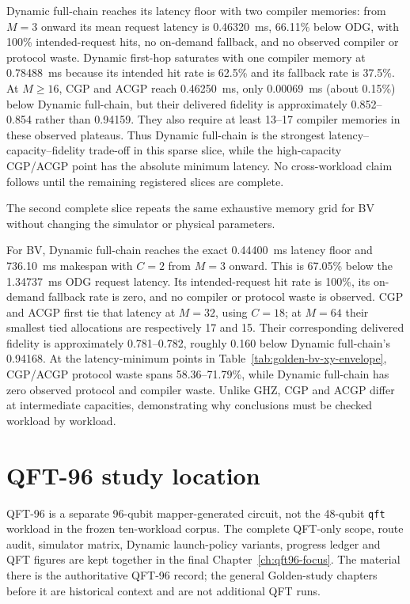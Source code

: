 

Dynamic full-chain reaches its latency floor with two compiler memories: from
$M=3$ onward its mean request latency is 0.46320~ms, 66.11\% below ODG, with
100\% intended-request hits, no on-demand fallback, and no observed compiler or
protocol waste. Dynamic first-hop saturates with one compiler memory at
0.78488~ms because its intended hit rate is 62.5\% and its fallback rate is
37.5\%. At $M\geq16$, CGP and ACGP reach 0.46250~ms, only 0.00069~ms (about
0.15\%) below Dynamic full-chain, but their delivered fidelity is approximately
0.852--0.854 rather than 0.94159. They also require at least 13--17 compiler
memories in these observed plateaus. Thus Dynamic full-chain is the strongest
latency--capacity--fidelity trade-off in this sparse slice, while the high-capacity
CGP/ACGP point has the absolute minimum latency. No cross-workload claim follows
until the remaining registered slices are complete.

The second complete slice repeats the same exhaustive memory grid for BV without
changing the simulator or physical parameters.



For BV, Dynamic full-chain reaches the exact 0.44400~ms latency floor and
736.10~ms makespan with $C=2$ from $M=3$ onward. This is 67.05\% below the
1.34737~ms ODG request latency. Its intended-request hit rate is 100\%, its
on-demand fallback rate is zero, and no compiler or protocol waste is observed.
CGP and ACGP first tie that latency at $M=32$, using $C=18$; at $M=64$ their
smallest tied allocations are respectively 17 and 15. Their corresponding
delivered fidelity is approximately 0.781--0.782, roughly 0.160 below Dynamic
full-chain's 0.94168. At the latency-minimum points in
Table~\ref{tab:golden-bv-xy-envelope}, CGP/ACGP protocol waste spans
58.36--71.79\%, while Dynamic full-chain has zero observed protocol and compiler
waste. Unlike GHZ, CGP and ACGP differ at intermediate capacities, demonstrating
why conclusions must be checked workload by workload.

\section{QFT-96 study location}

QFT-96 is a separate 96-qubit mapper-generated circuit, not the 48-qubit
\texttt{qft} workload in the frozen ten-workload corpus. The complete QFT-only
scope, route audit, simulator matrix, Dynamic launch-policy variants, progress
ledger and QFT figures are kept together in the final Chapter~\ref{ch:qft96-focus}.
The material there is the authoritative QFT-96 record; the general Golden-study
chapters before it are historical context and are not additional QFT runs.

